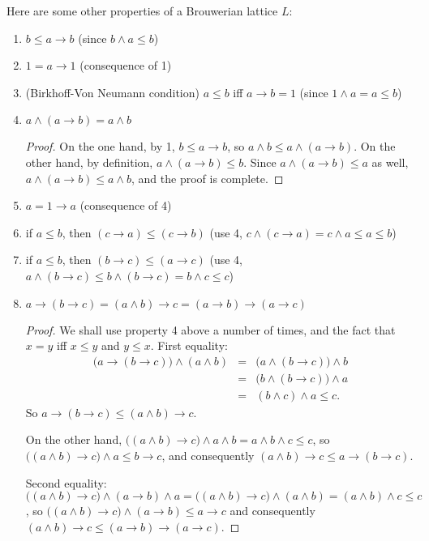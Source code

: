 \documentclass[12pt]{article}
\begin{document}
Here are some other properties of a Brouwerian lattice $L$:
\begin{enumerate}
\item $b\le a\to b$ (since $b\wedge a\le b$)
\item $1=a\to 1$ (consequence of 1)
\item (Birkhoff-Von Neumann condition) $a\le b$ iff $a\to b=1$ (since $1\wedge a=a\le b$)
\item $a\wedge (a\to b)= a\wedge b$ 
\begin{proof}
On the one hand, by 1, $b\le a\to b$, so $a\wedge b\le a\wedge (a\to b)$.  On the other hand, by definition, $a\wedge (a\to b)\le b$.  Since $a\wedge (a\to b)\le a$ as well, $a\wedge (a\to b)\le a\wedge b$, and the proof is complete.
\end{proof}
\item $a=1\to a$ (consequence of 4)
\item if $a\le b$, then $(c\to a)\le (c\to b)$ (use 4, $c\wedge (c\to a)=c\wedge a\le a\le b$)
\item if $a\le b$, then $(b\to c)\le (a\to c)$ (use 4, $a\wedge (b\to c)\le b\wedge (b\to c)=b\wedge c\le c$)
\item $a\to (b\to c)=(a \wedge b)\to c = (a\to b)\to (a\to c)$
\begin{proof}  We shall use property 4 above a number of times, and the fact that $x=y$ iff $x\le y$ and $y\le x$.
First equality:  
\begin{eqnarray*}
\big( a\to (b\to c) \big) \wedge (a\wedge b) &=& \big( a \wedge (b\to c)\big) \wedge b \\ &=& \big( b\wedge (b\to c)\big) \wedge a \\ &=& (b\wedge c)\wedge a\le c.\end{eqnarray*} 
So $a\to (b\to c)\le (a\wedge b)\to c$.  

On the other hand, $\big( (a\wedge b)\to c \big)\wedge a \wedge b=a\wedge b\wedge c\le c$, so $\big( (a\wedge b)\to c \big)\wedge a\le b\to c$, and consequently $(a\wedge b)\to c \le  a\to (b\to c)$.

Second equality: $\big( (a\wedge b)\to c \big) \wedge (a\to b) \wedge a = \big( (a\wedge b)\to c \big)\wedge (a\wedge b)=(a\wedge b)\wedge c\le c$, so $\big( (a\wedge b)\to c \big) \wedge (a\to b) \le a\to c$ and consequently $(a\wedge b)\to c \le (a\to b)\to (a\to c)$.
 

\end{proof}
\end{enumerate}
\end{document}
